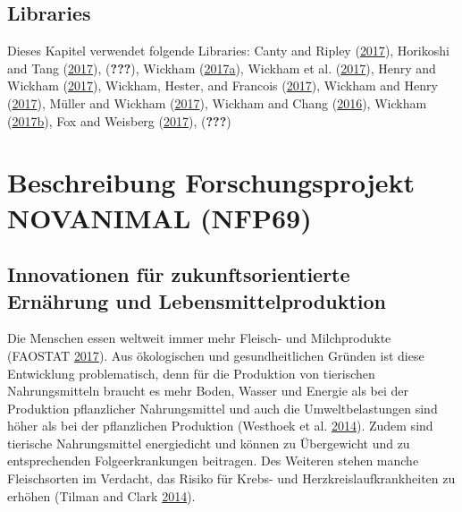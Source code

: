 \documentclass[]{book}
\begin{document}
\subsection{Libraries}\label{libraries}

Dieses Kapitel verwendet folgende Libraries: Canty and Ripley
(\protect\hyperlink{ref-R-boot}{2017}), Horikoshi and Tang
(\protect\hyperlink{ref-R-ggfortify}{2017}), ({\textbf{???}}), Wickham
(\protect\hyperlink{ref-R-stringr}{2017}\protect\hyperlink{ref-R-stringr}{a}),
Wickham et al. (\protect\hyperlink{ref-R-dplyr}{2017}), Henry and
Wickham (\protect\hyperlink{ref-R-purrr}{2017}), Wickham, Hester, and
Francois (\protect\hyperlink{ref-R-readr}{2017}), Wickham and Henry
(\protect\hyperlink{ref-R-tidyr}{2017}), Müller and Wickham
(\protect\hyperlink{ref-R-tibble}{2017}), Wickham and Chang
(\protect\hyperlink{ref-R-ggplot2}{2016}), Wickham
(\protect\hyperlink{ref-R-tidyverse}{2017}\protect\hyperlink{ref-R-tidyverse}{b}),
Fox and Weisberg (\protect\hyperlink{ref-R-car}{2017}), ({\textbf{???}})

\section{Beschreibung Forschungsprojekt NOVANIMAL
(NFP69)}\label{beschreibung-forschungsprojekt-novanimal-nfp69}

\subsection{Innovationen für zukunftsorientierte Ernährung und
Lebensmittelproduktion}\label{innovationen-fur-zukunftsorientierte-ernahrung-und-lebensmittelproduktion}

Die Menschen essen weltweit immer mehr Fleisch- und Milchprodukte
(FAOSTAT
\protect\hyperlink{ref-food_and_agriculture_organization_of_the_united_nations_statistics_faostat_commodity_2017}{2017}).
Aus ökologischen und gesundheitlichen Gründen ist diese Entwicklung
problematisch, denn für die Produktion von tierischen Nahrungsmitteln
braucht es mehr Boden, Wasser und Energie als bei der Produktion
pflanzlicher Nahrungsmittel und auch die Umweltbelastungen sind höher
als bei der pflanzlichen Produktion (Westhoek et al.
\protect\hyperlink{ref-westhoek_food_2014}{2014}). Zudem sind tierische
Nahrungsmittel energiedicht und können zu Übergewicht und zu
entsprechenden Folgeerkrankungen beitragen. Des Weiteren stehen manche
Fleischsorten im Verdacht, das Risiko für Krebs- und
Herzkreislaufkrankheiten zu erhöhen (Tilman and Clark
\protect\hyperlink{ref-tilman_global_2014}{2014}).
\end{document}

